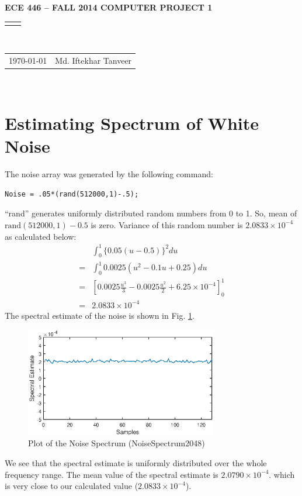 \documentclass[12pt]{article}
\renewcommand{\title}[1]{\textbf{#1}\\}
\renewcommand{\line}{\begin{tabularx}{\textwidth}{X>{\raggedleft}X}\hline\\\end{tabularx}\\[-0.5cm]}
\newcommand{\leftright}[2]{\begin{tabularx}{\textwidth}{X>{\raggedleft}X}#1%
& #2\\\end{tabularx}\\[-0.5cm]}
\begin{document}

\title{ECE 446 – FALL 2014 COMPUTER PROJECT 1}
\line
\leftright{\today}{Md. Iftekhar Tanveer} %

\section{Estimating Spectrum of White Noise}
The noise array was generated by the following command:
\begin{verbatim}
Noise = .05*(rand(512000,1)-.5);
\end{verbatim}
``rand'' generates uniformly distributed random numbers from 0 to 1. So, mean of $\text{rand}(512000,1)-0.5$ is zero. Variance of this random number is $2.0833\times10^{-4}$ as calculated below:
\begin{equation}
\begin{split}
 & \int_{0}^{1}\{0.05(u-0.5)\}^{2}du\\
= & \int_{0}^{1}0.0025(u^{2}-0.1u+0.25)du\\
= & \left[0.0025\frac{u^{3}}{3}-0.0025\frac{u^{2}}{2}+6.25\times10^{-4}\right]_{0}^{1}\\
= & 2.0833\times10^{-4}
\end{split}
\end{equation}
The spectral estimate of the noise is shown in Fig. \ref{fig:spectralEst}.
\begin{figure}[h]
    \centering
    \includegraphics[width=0.75\textwidth]{spectralestimate}
    \caption{Plot of the Noise Spectrum (NoiseSpectrum2048)}
    \label{fig:spectralEst}
\end{figure}
We see that the spectral estimate is uniformly distributed over the whole frequency range. The mean value of the spectral estimate is $2.0790\times10^{-4}$. which is very close to our calculated value ($2.0833\times10^{-4}$).
\end{document}

